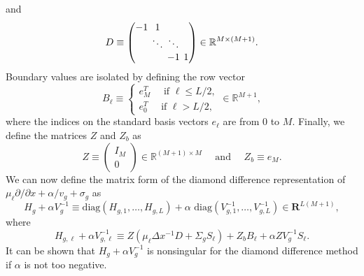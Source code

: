 and
\begin{equation}
D \equiv
\setlength\arraycolsep{2pt}
\begin{pmatrix}
-1 & 1 & & \\
& \ddots & \ddots & \\
& & -1 & 1
\end{pmatrix} \in \mathbb{R}^{M \times (M+1)}.
\end{equation}
Boundary values are isolated by defining the row vector
\begin{equation}
	B_{\ell} \equiv \begin{cases}
				e_{M}^{T} \quad \text{ if } \ell \leq L/2, \\
				e_{0}^{T}  \quad \text{ if } \ell > L/2,
                              \end{cases} \in \mathbb{R}^{M+1},
\end{equation}
where the indices on the standard basis vectors $e_{\ell}$ are from 0 to $M$. Finally, we define the matrices $Z$ and $Z_{b}$ as
\begin{equation}
	Z \equiv \begin{pmatrix}
			I_{M} \\
			0
		     \end{pmatrix} \in \mathbb{R}^{(M+1) \times M} \quad \text{ and } \quad
	Z_{b} \equiv  e_{M}.
\end{equation}
We can now define the matrix form of the diamond difference representation of  $\mu_{\ell} \partial/\partial x + \alpha/v_{g} + \sigma_{g}$ as 
\begin{equation}
	H_{g} + \alpha V^{-1}_{g} \equiv \text{diag}(H_{g,1}, \dots, H_{g,L}) + \alpha \text{ diag}(V^{-1}_{g,1}, \dots, V^{-1}_{g,L}) \in \mathbf{R}^{L(M+1)},
\end{equation}
where
\begin{equation}
	H_{g,\ell} + \alpha V^{-1}_{g,\ell} \equiv Z(\mu_{\ell}\Delta x^{-1}D + \Sigma_{g}S_{\ell}) + Z_{b}B_{\ell} + \alpha ZV_{g}^{-1}S_{\ell}.
\end{equation}
It can be shown that $H_{g} + \alpha V^{-1}_{g}$ is nonsingular for the diamond difference method if $\alpha$ is not too negative.

